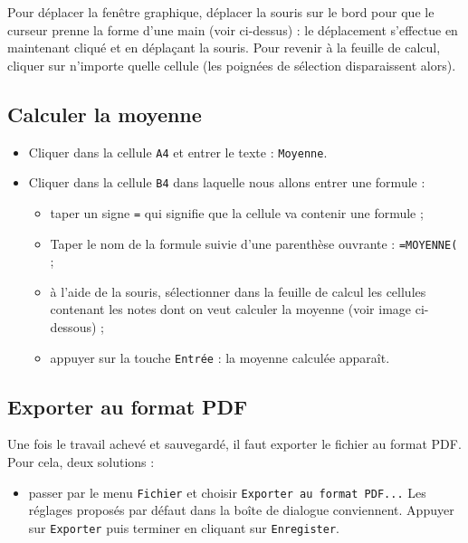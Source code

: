 
Pour déplacer la fenêtre graphique, déplacer la souris sur le bord pour que le curseur prenne la forme d'une main (voir ci-dessus) : le déplacement s'effectue en maintenant cliqué et en déplaçant la souris. Pour revenir à la feuille de calcul, cliquer sur n'importe quelle cellule (les poignées de sélection disparaissent alors).









\subsection{Calculer la moyenne}

\begin{itemize}
\item Cliquer dans la cellule \texttt{A4} et entrer le texte : \texttt{Moyenne}.
\item Cliquer dans la cellule \texttt{B4} dans laquelle nous allons entrer une formule :
        \begin{itemize}
        \item taper un signe \texttt{=} qui signifie que la cellule va contenir une formule ;
        \item Taper le nom de la formule suivie d'une parenthèse ouvrante : \texttt{=MOYENNE(} ;
        \item à l'aide de la souris, sélectionner dans la feuille de calcul les cellules contenant les notes dont on veut calculer la moyenne (voir image ci-dessous) ;
        \item appuyer sur la touche \texttt{Entrée} : la moyenne calculée apparaît.
        \end{itemize}
\end{itemize}




\subsection{Exporter au format PDF}

Une fois le travail achevé et sauvegardé, il faut exporter le fichier au format PDF. Pour cela, deux solutions :
\begin{itemize}\item passer par le menu \texttt{Fichier} et choisir \texttt{Exporter au format PDF...} Les réglages proposés par défaut dans la boîte de dialogue conviennent. Appuyer sur \texttt{Exporter} puis terminer en cliquant sur \texttt{Enregister}.\end{itemize} 

